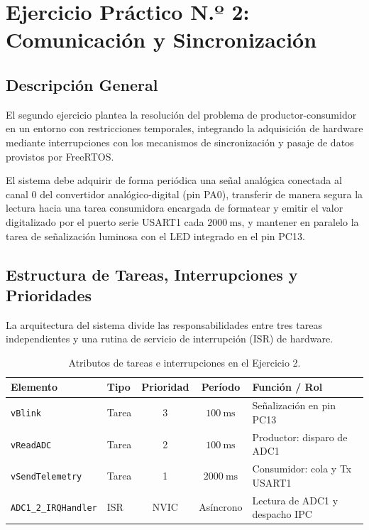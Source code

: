 \chapter{Ejercicio Práctico N.º 2: Comunicación y Sincronización}
\label{sec.ej2:comunicacion}

\section{Descripción General}

El segundo ejercicio plantea la resolución del problema de productor-consumidor en un entorno con restricciones
temporales, integrando la adquisición de hardware mediante interrupciones con los mecanismos de sincronización
y pasaje de datos provistos por FreeRTOS.

El sistema debe adquirir de forma periódica una señal analógica conectada al canal 0 del convertidor analógico-digital
(pin PA0), transferir de manera segura la lectura hacia una tarea consumidora encargada de formatear y emitir el valor
digitalizado por el puerto serie USART1 cada $\SI{2000}{\milli\second}$, y mantener en paralelo la tarea de señalización
luminosa con el LED integrado en el pin PC13.

\section{Estructura de Tareas, Interrupciones y Prioridades}

La arquitectura del sistema divide las responsabilidades entre tres tareas independientes y una rutina de servicio
de interrupción (ISR) de hardware.

\begin{table}[!ht]
\centering
\small
\caption{Atributos de tareas e interrupciones en el Ejercicio 2.}
\label{tab.ej2:tareas}
\begin{tabular}{llccl}
\toprule
Elemento & Tipo & Prioridad & Período & Función / Rol \\
\midrule
\texttt{vBlink} & Tarea & 3 & $\SI{100}{\milli\second}$ & Señalización en pin PC13 \\
\texttt{vReadADC} & Tarea & 2 & $\SI{100}{\milli\second}$ & Productor: disparo de ADC1 \\
\texttt{vSendTelemetry} & Tarea & 1 & $\SI{2000}{\milli\second}$ & Consumidor: cola y Tx USART1 \\
\texttt{ADC1\_2\_IRQHandler} & ISR & NVIC & Asíncrono & Lectura de ADC1 y despacho IPC \\
\bottomrule
\end{tabular}
\end{table}

